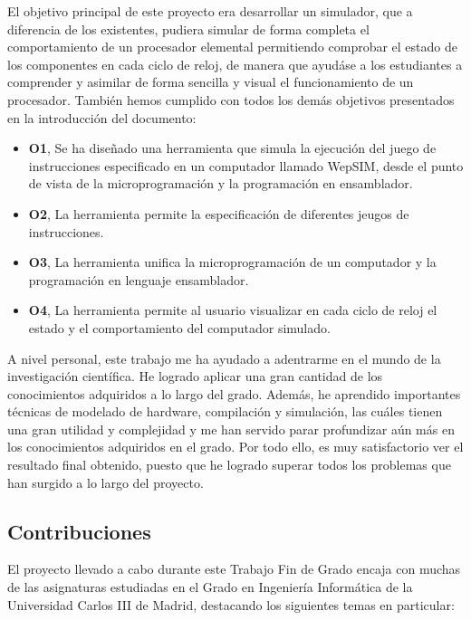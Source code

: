 El objetivo principal de este proyecto era desarrollar un simulador, que a diferencia de los existentes, pudiera simular de forma completa el comportamiento de un procesador elemental permitiendo comprobar el estado de los componentes en cada ciclo de reloj, de manera que ayudáse a los estudiantes a comprender y asimilar de forma sencilla y visual el funcionamiento de un procesador.  También hemos cumplido con todos los demás objetivos presentados en la introducción del documento:

\begin{itemize}

\item \textbf{O1}, Se ha diseñado una herramienta que simula la ejecución del juego de instrucciones especificado en un computador llamado WepSIM, desde el punto de vista de la microprogramación y la programación en ensamblador.

\item \textbf{O2}, La herramienta permite la especificación de diferentes jeugos de instrucciones.

\item \textbf{O3}, La herramienta unifica la microprogramación de un computador y la programación en lenguaje ensamblador.

\item \textbf{O4}, La herramienta permite al usuario visualizar en cada ciclo de reloj el estado y el comportamiento del computador simulado.

\end{itemize}

A nivel personal, este trabajo me ha ayudado a adentrarme en el mundo de la investigación científica. He logrado aplicar una gran cantidad de los conocimientos adquiridos a lo largo del grado. Además, he aprendido importantes técnicas de modelado de hardware, compilación y simulación, las cuáles tienen una gran utilidad y complejidad y me han servido parar profundizar aún más en los conocimientos adquiridos en el grado. Por todo ello, es muy satisfactorio ver el resultado final obtenido, puesto que he logrado superar todos los problemas que han surgido a lo largo del proyecto.

\subsection{Contribuciones}

El proyecto llevado a cabo durante este Trabajo Fin de Grado encaja con muchas de las asignaturas estudiadas en el Grado en Ingeniería Informática de la Universidad Carlos III de Madrid, destacando los siguientes temas en particular:

